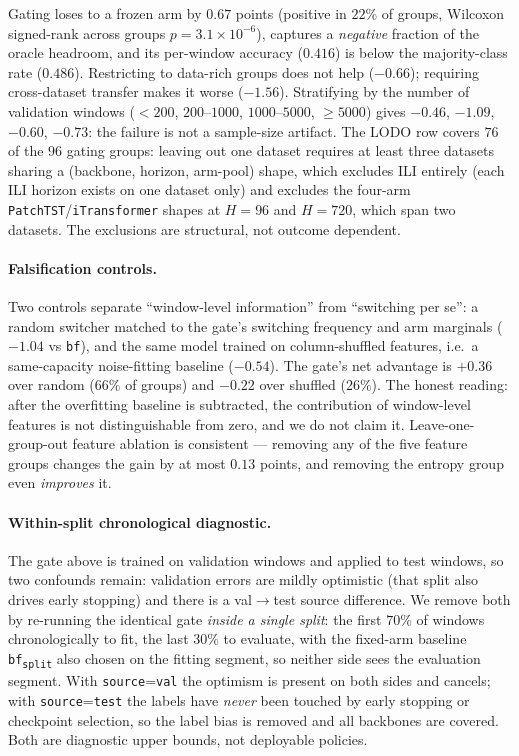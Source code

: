 \documentclass[a4paper,fleqn]{cas-sc}
\newcommand{\arm}[1]{\texttt{#1}}
\begin{document}
Gating loses to a frozen arm by $0.67$ points (positive in $22\%$ of groups,
Wilcoxon signed-rank across groups $p{=}3.1\!\times\!10^{-6}$), captures a
\emph{negative} fraction of the oracle headroom, and its per-window accuracy
($0.416$) is below the majority-class rate ($0.486$). Restricting to
data-rich groups does not help ($-0.66$); requiring cross-dataset transfer makes
it worse ($-1.56$). Stratifying by the number of validation windows
($<200$, $200$--$1000$, $1000$--$5000$, $\geq5000$) gives
$-0.46$, $-1.09$, $-0.60$, $-0.73$: the failure is not a sample-size artifact.
The LODO row covers $76$ of the $96$ gating groups: leaving out one dataset
requires at least three datasets sharing a (backbone, horizon, arm-pool) shape,
which excludes ILI entirely (each ILI horizon exists on one dataset only) and
excludes the four-arm \arm{PatchTST}/\arm{iTransformer} shapes at $H{=}96$ and
$H{=}720$, which span two datasets. The exclusions are structural, not outcome
dependent.

\paragraph{Falsification controls.}
Two controls separate ``window-level information'' from ``switching per se'':
a random switcher matched to the gate's switching frequency and arm marginals
($-1.04$ vs \arm{bf}), and the same model trained on column-shuffled features,
i.e.\ a same-capacity noise-fitting baseline ($-0.54$). The gate's net advantage
is $+0.36$ over random ($66\%$ of groups) and $-0.22$ over shuffled ($26\%$).
The honest reading: after the overfitting baseline is subtracted, the
contribution of window-level features is not distinguishable from zero, and we
do not claim it. Leave-one-group-out feature ablation is consistent --- removing
any of the five feature groups changes the gain by at most $0.13$ points, and
removing the entropy group even \emph{improves} it.

\paragraph{Within-split chronological diagnostic.}
The gate above is trained on validation windows and applied to test windows, so
two confounds remain: validation errors are mildly optimistic (that split also
drives early stopping) and there is a val$\to$test source difference. We remove
both by
re-running the identical gate \emph{inside a single split}: the first $70\%$ of
windows chronologically to fit, the last $30\%$ to evaluate, with the fixed-arm
baseline \arm{bf\textsubscript{split}} also chosen on the fitting segment, so
neither side sees the evaluation segment. With
\texttt{source}=\arm{val} the optimism is present on both sides and cancels;
with \texttt{source}=\arm{test} the labels have \emph{never} been touched by
early stopping or checkpoint selection, so the label bias is removed and all
backbones are covered. Both are diagnostic upper bounds, not deployable
policies.
\end{document}
